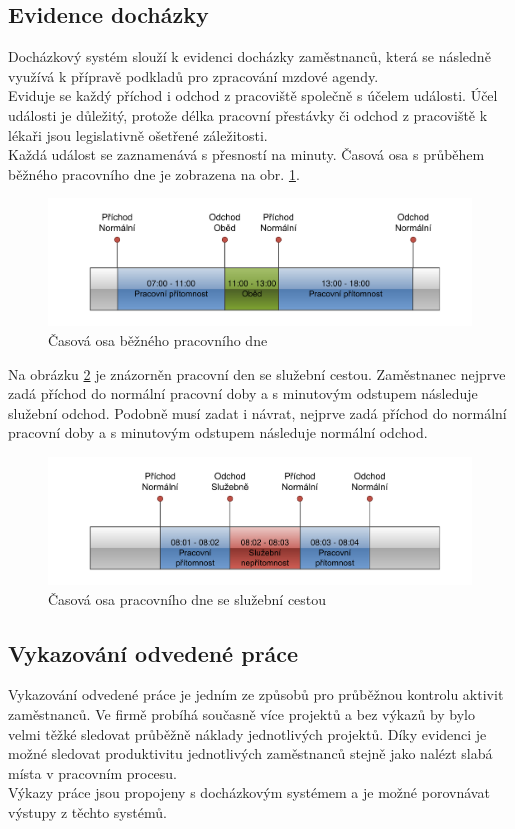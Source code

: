 \documentclass{diplomka}
\begin{document}
\subsection{Evidence docházky}
Docházkový systém slouží k evidenci docházky zaměstnanců, která se následně využívá k přípravě podkladů pro zpracování mzdové agendy.\\ \indent
Eviduje se každý příchod i odchod z pracoviště společně s účelem události. Účel události je důležitý, protože délka pracovní přestávky či odchod z pracoviště k lékaři jsou legislativně ošetřené záležitosti.\\ \indent Každá událost se zaznamenává s přesností na minuty. Časová osa s průběhem běžného pracovního dne je zobrazena na obr. \ref{obr:attn}.
\begin{figure}[H]
  \centering
  \includegraphics[scale=0.7]{visio/attnormal.pdf}
\caption{Časová osa běžného pracovního dne}
\label{obr:attn}
\end{figure}

Na obrázku \ref{obr:atts} je znázorněn pracovní den se služební cestou. Zaměstnanec nejprve zadá příchod do normální pracovní doby a s minutovým odstupem následuje služební odchod. Podobně musí zadat i návrat, nejprve zadá příchod do normální pracovní doby a s minutovým odstupem následuje normální odchod.
\begin{figure}[H]
  \centering
  \includegraphics[scale=0.7]{visio/attservice.pdf}
\caption{Časová osa pracovního dne se služební cestou}
\label{obr:atts}
\end{figure}

\subsection{Vykazování odvedené práce}
Vykazování odvedené práce je jedním ze způsobů pro průběžnou kontrolu aktivit zaměstnanců. Ve firmě probíhá současně více projektů a bez výkazů by bylo velmi těžké sledovat průběžně náklady jednotlivých projektů. 
Díky evidenci je možné sledovat produktivitu jednotlivých zaměstnanců stejně jako nalézt slabá místa v pracovním procesu.
\\ \indent Výkazy práce jsou propojeny s docházkovým systémem a je možné porovnávat výstupy z těchto systémů. 
\end{document}
